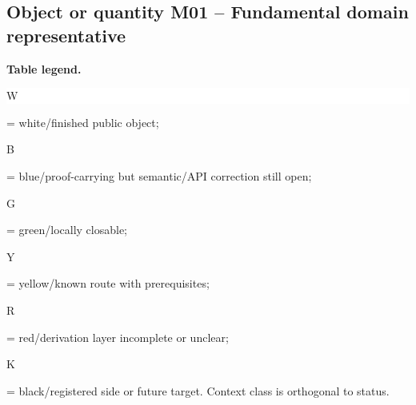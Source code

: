 \subsection*{Object or quantity M01 -- Fundamental domain representative}
\hypertarget{objproof:M01}{}
\par\smallskip\noindent\begin{minipage}{0.99\linewidth}\footnotesize\raggedright\textbf{Table legend.} \colorbox{white}{\strut W} = white/finished public object; \colorbox{cyan!20}{\strut B} = blue/proof-carrying but semantic/API correction still open; \colorbox{green!18}{\strut G} = green/locally closable; \colorbox{yellow!25}{\strut Y} = yellow/known route with prerequisites; \colorbox{red!20}{\strut R} = red/derivation layer incomplete or unclear; \colorbox{black!18}{\strut K} = black/registered side or future target. Context class is orthogonal to status.\end{minipage}\par\vspace{0.25em}
